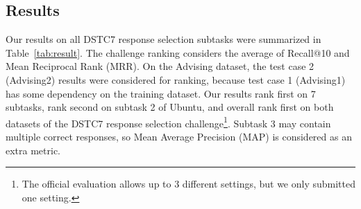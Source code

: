 \documentclass[letterpaper]{article} \usepackage{aaai19}  \usepackage{times}  \usepackage{helvet}  \usepackage{courier}  \usepackage{url}  \usepackage{graphicx}
\begin{document}
\begin{table}[ht]
\begin{center}
\end{center}
\caption{Statistics of pre-trained word embeddings. The 1-3 rows are from GloVe; 4-5 rows are from fastText; 6 is from word2vec.}
\label{tab:stat:word}
\end{table}

\subsection{Results}
Our results on all DSTC7 response selection subtasks were summarized in Table~\ref{tab:result}. The challenge ranking considers the average of Recall@10 and Mean Reciprocal Rank (MRR). On the Advising dataset, the test case 2 (Advising2) results were considered for ranking, because test case 1 (Advising1) has some dependency on the training dataset. Our results rank first on 7 subtasks, rank second on subtask 2 of Ubuntu, and overall rank first on both datasets of the DSTC7 response selection challenge\footnote{The official evaluation allows up to 3 different settings, but we only submitted one setting.}. Subtask 3 may contain multiple correct responses, so Mean Average Precision (MAP) is considered as an extra metric.
\end{document}
